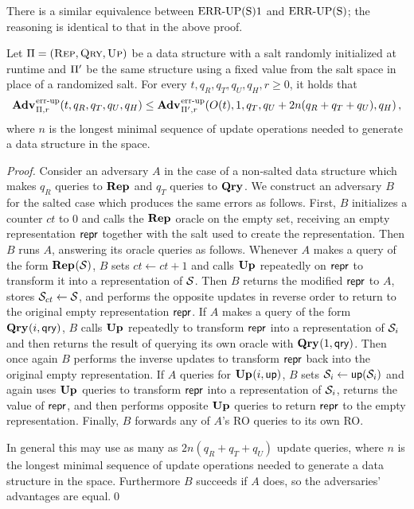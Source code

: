 There is a similar equivalence between $\textnormal{ERR\mbox{-}UP(S)}1$ and $\textnormal{ERR\mbox{-}UP(S)}$; the reasoning is identical to that in the above proof.

\begin{lemma}\label{lemma:nosalt}
  Let $\mathrm{\Pi} = (\textsc{Rep}, \textsc{Qry}, \textsc{Up})$ be a data structure with a salt randomly initialized at runtime and $\mathrm{\Pi}'$ be the same structure using a fixed value from the salt space in place of a randomized salt. For every $t, q_R, q_T, q_U, q_H, r\geq 0$, it holds that
  \[
    \Adv{\errep}_{\struct,r}(t, q_R, q_T, q_U, q_H) \leq
    \Adv{\errep}_{\struct',r}(O(t), 1, q_T, q_U+2n(q_R+q_T+q_U), q_H) \,,
  \]
  where $n$ is the longest minimal sequence of update operations needed to generate a data structure in the space.
\end{lemma}
\begin{proof}
Consider an adversary $A$ in the case of a non-salted data structure which makes $q_R$ queries to $\mathbf{Rep}\hspace{0.5pt}$ and $q_T$ queries to $\mathbf{Qry}\hspace{0.5pt}$. We construct an adversary $B$ for the salted case which produces the same errors as follows. First, $B$ initializes a counter $ct$ to 0 and calls the $\mathbf{Rep}\hspace{0.5pt}$ oracle on the empty set, receiving an empty representation $\mathsf{repr}$ together with the salt used to create the representation. Then $B$ runs $A$, answering its oracle queries as follows. Whenever $A$ makes a query of the form $\mathbf{Rep}\hspace{0.5pt}(\mathcal{S})$, $B$ sets $ct \gets ct + 1$ and calls $\mathbf{Up}\hspace{0.5pt}$ repeatedly on $\mathsf{repr}$ to transform it into a representation of $\mathcal{S}$. Then $B$ returns the modified $\mathsf{repr}$ to $A$, stores $\mathcal{S}_{ct} \gets \mathcal{S}$, and performs the opposite updates in reverse order to return to the original empty representation $\mathsf{repr}$. If $A$ makes a query of the form $\mathbf{Qry}\hspace{0.5pt}(i,\mathsf{qry})$, $B$ calls $\mathbf{Up}\hspace{0.5pt}$ repeatedly to transform $\mathsf{repr}$ into a representation of $\mathcal{S}_i$ and then returns the result of querying its own oracle with $\mathbf{Qry}\hspace{0.5pt}(1, \mathsf{qry})$. Then once again $B$ performs the inverse updates to transform $\mathsf{repr}$ back into the original empty representation. If $A$ queries for $\mathbf{Up}\hspace{0.5pt}(i, \mathsf{up})$, $B$ sets $\mathcal{S}_i \gets \mathsf{up}(\mathcal{S}_i)$ and again uses $\mathbf{Up}\hspace{0.5pt}$ queries to transform $\mathsf{repr}$ into a representation of $\mathcal{S}_i$, returns the value of $\mathsf{repr}$, and then performs opposite $\mathbf{Up}\hspace{0.5pt}$ queries to return $\mathsf{repr}$ to the empty representation. Finally, $B$ forwards any of $A$'s RO queries to its own RO.

In general this may use as many as $2n(q_R+q_T+q_U)$ update queries, where $n$ is the longest minimal sequence of update operations needed to generate a data structure in the space. Furthermore $B$ succeeds if $A$ does, so the adversaries' advantages are equal.\hfill\qed
\end{proof}

